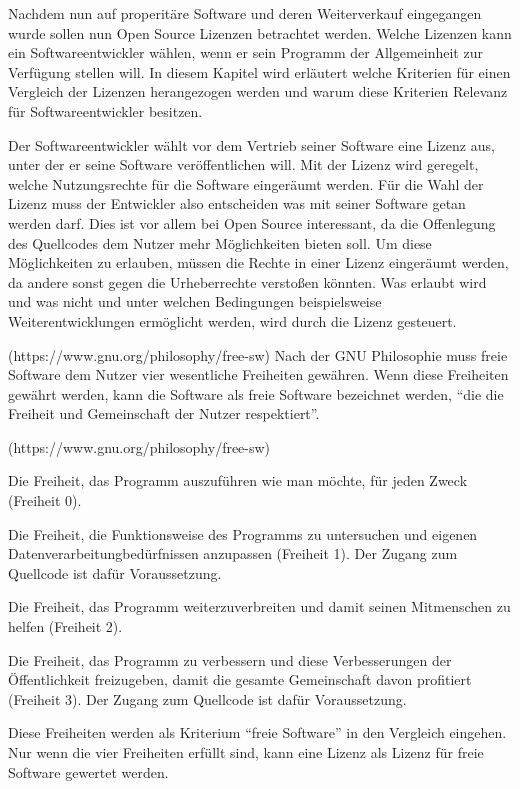 Nachdem nun auf properitäre Software und deren Weiterverkauf eingegangen wurde sollen nun Open Source Lizenzen betrachtet werden. Welche Lizenzen kann ein Softwareentwickler w\"ahlen, wenn er sein Programm der Allgemeinheit zur Verf\"ugung stellen will.  In diesem Kapitel wird erl\"autert welche Kriterien f\"ur einen Vergleich der Lizenzen herangezogen werden und warum diese Kriterien Relevanz f\"ur Softwareentwickler besitzen.

Der Softwareentwickler w\"ahlt vor dem Vertrieb seiner Software eine Lizenz aus, unter der er seine Software ver\"offentlichen will. Mit der Lizenz wird geregelt, welche Nutzungsrechte f\"ur die Software einger\"aumt werden. F\"ur die Wahl der Lizenz muss der Entwickler also entscheiden was mit seiner Software getan werden darf. Dies ist vor allem bei Open Source interessant, da die Offenlegung des Quellcodes dem Nutzer mehr M\"oglichkeiten bieten soll. Um diese M\"oglichkeiten zu erlauben, m\"ussen die Rechte in einer Lizenz einger\"aumt werden, da andere sonst gegen die Urheberrechte verstoßen k\"onnten. Was erlaubt wird und was nicht und unter welchen Bedingungen beispielsweise Weiterentwicklungen erm\"oglicht werden, wird durch die Lizenz gesteuert. 

(https://www.gnu.org/philosophy/free-sw) Nach der GNU Philosophie muss freie Software dem Nutzer vier wesentliche Freiheiten gew\"ahren. Wenn diese Freiheiten gew\"ahrt werden, kann die Software als freie Software bezeichnet werden, “die die Freiheit und Gemeinschaft der Nutzer respektiert”. 

(https://www.gnu.org/philosophy/free-sw) 
\begin{seList} 
\item Die Freiheit, das Programm auszuf\"uhren wie man m\"ochte, f\"ur jeden Zweck (Freiheit 0).
\item Die Freiheit, die Funktionsweise des Programms zu untersuchen und eigenen Datenverarbeitungbed\"urfnissen anzupassen (Freiheit 1). Der Zugang zum Quellcode ist daf\"ur Voraussetzung.
\item Die Freiheit, das Programm weiterzuverbreiten und damit seinen Mitmenschen zu helfen (Freiheit 2).
\item Die Freiheit, das Programm zu verbessern und diese Verbesserungen der \"Offentlichkeit freizugeben, damit die gesamte Gemeinschaft davon profitiert (Freiheit 3). Der Zugang zum Quellcode ist daf\"ur Voraussetzung.
\end{seList}
Diese Freiheiten werden als Kriterium “freie Software” in den Vergleich eingehen. Nur wenn die vier Freiheiten erf\"ullt sind, kann eine Lizenz als Lizenz f\"ur freie Software gewertet werden. 


